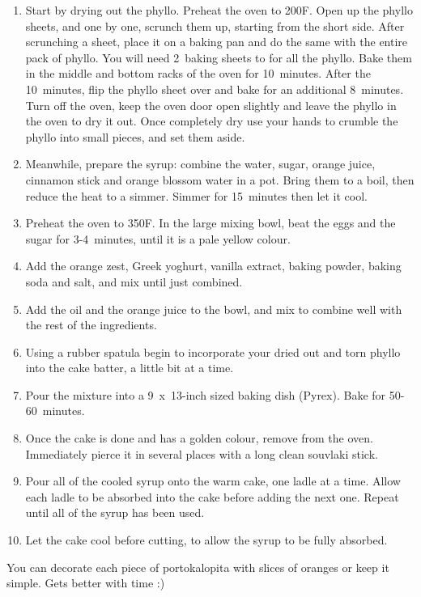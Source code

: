 \begin{enumerate}
    \item Start by drying out the phyllo. Preheat the oven to 200\degree F. Open up the phyllo sheets, and one by one, scrunch them up, starting from the short side. After scrunching a sheet, place it on a baking pan and do the same with the entire pack of phyllo. You will need 2~baking sheets to for all the phyllo. Bake them in the middle and bottom racks of the oven for 10~minutes. After the 10~minutes, flip the phyllo sheet over and bake for an additional 8~minutes. Turn off the oven, keep the oven door open slightly and leave the phyllo in the oven to dry it out. Once completely dry use your hands to crumble the phyllo into small pieces, and set them aside.
    \item Meanwhile, prepare the syrup: combine the water, sugar, orange juice, cinnamon stick and orange blossom water in a pot. Bring them to a boil, then reduce the heat to a simmer. Simmer for 15~minutes then let it cool.
    \item Preheat the oven to 350\degree F. In the large mixing bowl, beat the eggs and the sugar for 3-4~minutes, until it is a pale yellow colour.
    \item Add the orange zest, Greek yoghurt, vanilla extract, baking powder, baking soda and salt, and mix until just combined.
    \item Add the oil and the orange juice to the bowl, and mix to combine well with the rest of the ingredients.
    \item Using a rubber spatula begin to incorporate your dried out and torn phyllo into the cake batter, a little bit at a time.
    \item Pour the mixture into a 9~x~13-inch sized baking dish (Pyrex). Bake for 50-60~minutes.
    \item Once the cake is done and has a golden colour, remove from the oven. Immediately pierce it in several places with a long clean souvlaki stick.
    \item Pour all of the cooled syrup onto the warm cake, one ladle at a time. Allow each ladle to be absorbed into the cake before adding the next one. Repeat until all of the syrup has been used.
    \item Let the cake cool before cutting, to allow the syrup to be fully absorbed.
\end{enumerate}

You can decorate each piece of portokalopita with slices of oranges or keep it simple. Gets better with time :)

